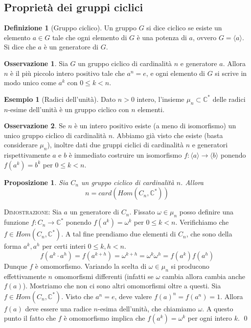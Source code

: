 \documentclass[11pt]{article}
\theoremstyle{plain}
\newtheorem{prop}[thm]{Proposizione}
\theoremstyle{definition}
\newtheorem{defn}{Definizione}[section]
\newtheorem{exmp}{Esempio}[section]
\newtheorem*{rem}{Osservazione}
\theoremstyle{remark}
\newcommand{\C}{\mathbb{C}}
\begin{document}
\newpage
\subsection{Proprietà dei gruppi ciclici}

\begin{defn}[Gruppo ciclico] Un gruppo $G$ si dice ciclico se esiste un elemento $a\in G$ tale che ogni
elemento di $G$ è una potenza di $a$, ovvero $G=\langle a\rangle$. Si dice che $a$ è un generatore di $G$.
\end{defn}

\begin{rem}
Sia $G$ un gruppo ciclico di cardinalità $n$ e generatore $a$. Allora $n$ è il più piccolo intero positivo tale che $a^n = e$,
e ogni elemento di $G$ si scrive in modo unico come $a^k$ con $0\le k < n$.
\end{rem}

\begin{exmp}[Radici dell'unità]
Dato $n>0$ intero, l'insieme $\mu_n\subset \C^*$ delle radici $n$-esime dell'unità è un gruppo ciclico con $n$ elementi.
\end{exmp}

\begin{rem} Se $n$ è un intero positivo esiste (a meno di isomorfismo) un unico gruppo ciclico di cardinalità $n$.
Abbiamo già visto che esiste (basta considerare $\mu_n$),
inoltre dati due gruppi ciclici di cardinalità $n$ e generatori rispettivamente $a$ e $b$ è immediato costruire un
isomorfismo $f:\langle a\rangle\to\langle b\rangle$ ponendo $f(a^k) = b^k$ per $0\le k < n$.
\end{rem}


\begin{prop} Sia $C_n$ un gruppo ciclico di cardinalità $n$. Allora
\[ n = card(Hom(C_n,\C^*))\]
\end{prop}
\textsc{Dimostrazione:} Sia $a$ un generatore di $C_n$. Fissato $\omega\in\mu_n$ posso definire
una funzione $f:C_n\to\C^*$ ponendo $f(a^k) = \omega^k$ per $0\le k < n$.
Verifichiamo che $f\in Hom(C_n, \C^*)$. A tal fine prendiamo due elementi di $C_n$, che sono della forma $a^k, a^h$ per certi interi $0\le k,h < n$.
\[f(a^k \cdot a^h) = f(a^{k+h}) = \omega^{k+h} = \omega^k \omega^h = f(a^k)f(a^h)\]
Dunque $f$ è omomorfismo. Variando la scelta di $\omega\in\mu_n$ si producono effettivamente $n$ omomorfismi differenti (infatti se $\omega$ cambia allora cambia anche $f(a)$).
Mostriamo che non ci sono altri omomorfismi oltre a questi.
Sia $f\in Hom(C_n,\C^*)$. Visto che $a^n=e$, deve valere $f(a)^n = f(a^n) = 1$. Allora $f(a)$ deve essere una radice $n$-esima
dell'unità, che chiamiamo $\omega$. A questo punto il fatto che $f$ è omomorfismo implica che $f(a^k) = \omega^k$ per ogni intero $k$. \qed
\end{document}
